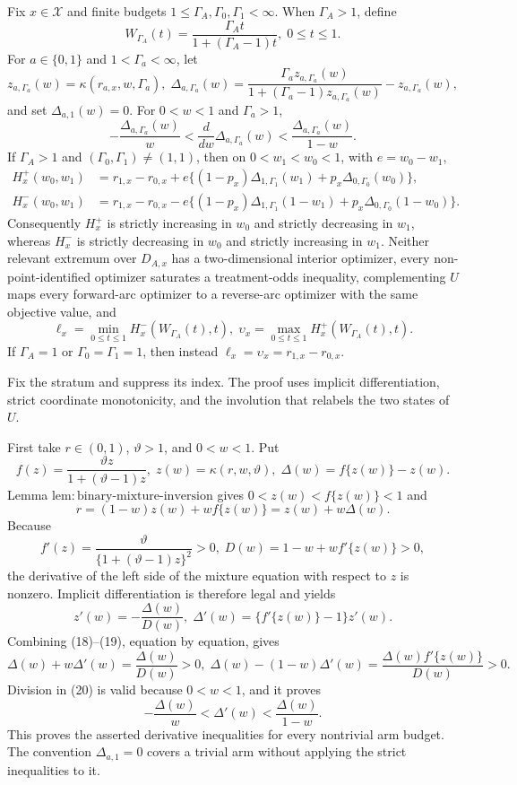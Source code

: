 Fix \(x\in\mathcal X\) and finite budgets \(1\leq\Gamma_A,\Gamma_0,\Gamma_1<\infty\).  When \(\Gamma_A>1\), define
\[
 W_{\Gamma_A}(t)=\frac{\Gamma_A t}{1+(\Gamma_A-1)t},\; 0\leq t\leq1.
\]
For \(a\in\{0,1\}\) and \(1<\Gamma_a<\infty\), let
\[
 z_{a,\Gamma_a}(w)=\kappa(r_{a,x},w,\Gamma_a),\;
 \Delta_{a,\Gamma_a}(w)=
 \frac{\Gamma_a z_{a,\Gamma_a}(w)}
      {1+(\Gamma_a-1)z_{a,\Gamma_a}(w)}-z_{a,\Gamma_a}(w),
\]
and set \(\Delta_{a,1}(w)=0\).  For \(0<w<1\) and \(\Gamma_a>1\),
\[
 -\frac{\Delta_{a,\Gamma_a}(w)}{w}
 <\frac{d}{dw}\Delta_{a,\Gamma_a}(w)
 <\frac{\Delta_{a,\Gamma_a}(w)}{1-w}.
\]
If \(\Gamma_A>1\) and \((\Gamma_0,\Gamma_1)\neq(1,1)\), then on \(0<w_1<w_0<1\), with \(e=w_0-w_1\),
\[
\begin{aligned}
H_x^+(w_0,w_1)
 &=r_{1,x}-r_{0,x}
 +e\{(1-p_x)\Delta_{1,\Gamma_1}(w_1)
       +p_x\Delta_{0,\Gamma_0}(w_0)\},\\
H_x^-(w_0,w_1)
 &=r_{1,x}-r_{0,x}
 -e\{(1-p_x)\Delta_{1,\Gamma_1}(1-w_1)
       +p_x\Delta_{0,\Gamma_0}(1-w_0)\}.
\end{aligned}
\]
Consequently \(H_x^+\) is strictly increasing in \(w_0\) and strictly decreasing in \(w_1\), whereas \(H_x^-\) is strictly decreasing in \(w_0\) and strictly increasing in \(w_1\).  Neither relevant extremum over \(D_{A,x}\) has a two-dimensional interior optimizer, every non-point-identified optimizer saturates a treatment-odds inequality, complementing \(U\) maps every forward-arc optimizer to a reverse-arc optimizer with the same objective value, and
\[
 \ell_x=\min_{0\leq t\leq1}H_x^-(W_{\Gamma_A}(t),t),
 \;
 \upsilon_x=\max_{0\leq t\leq1}H_x^+(W_{\Gamma_A}(t),t).
\]
If \(\Gamma_A=1\) or \(\Gamma_0=\Gamma_1=1\), then instead
\(\ell_x=\upsilon_x=r_{1,x}-r_{0,x}\).

Fix the stratum and suppress its index.  The proof uses implicit differentiation, strict coordinate monotonicity, and the involution that relabels the two states of \(U\).

First take \(r\in(0,1)\), \(\vartheta>1\), and \(0<w<1\).  Put
\[
 f(z)=\frac{\vartheta z}{1+(\vartheta-1)z},
 \; z(w)=\kappa(r,w,\vartheta),
 \; \Delta(w)=f\{z(w)\}-z(w).
 \tag{16}
\]
Lemma \(\mathrm{lem{:}binary\text{-}mixture\text{-}inversion}\) gives \(0<z(w)<f\{z(w)\}<1\) and
\[
 r=(1-w)z(w)+wf\{z(w)\}=z(w)+w\Delta(w).
 \tag{17}
\]
Because
\[
 f'(z)=\frac{\vartheta}{\{1+(\vartheta-1)z\}^2}>0,
 \;
 D(w)=1-w+wf'\{z(w)\}>0,
 \tag{18}
\]
the derivative of the left side of the mixture equation with respect to \(z\) is nonzero.  Implicit differentiation is therefore legal and yields
\[
 z'(w)=-\frac{\Delta(w)}{D(w)},
 \;
 \Delta'(w)=\{f'\{z(w)\}-1\}z'(w).
 \tag{19}
\]
Combining (18)--(19), equation by equation, gives
\[
 \Delta(w)+w\Delta'(w)=\frac{\Delta(w)}{D(w)}>0,
 \;
 \Delta(w)-(1-w)\Delta'(w)
 =\frac{\Delta(w)f'\{z(w)\}}{D(w)}>0.
 \tag{20}
\]
Division in (20) is valid because \(0<w<1\), and it proves
\[
 -\frac{\Delta(w)}{w}<\Delta'(w)
 <\frac{\Delta(w)}{1-w}.
 \tag{21}
\]
This proves the asserted derivative inequalities for every nontrivial arm budget.  The convention \(\Delta_{a,1}=0\) covers a trivial arm without applying the strict inequalities to it.

